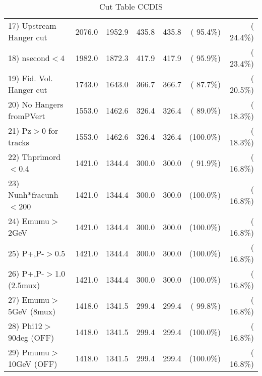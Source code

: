 \begin{table}[h!]
\begin{tabular}{||l||r|r|r|r|r|r||}
 17) Upstream Hanger cut  &       2076.0 &       1952.9 &        435.8 &        435.8 & ( 95.4\%) & ( 24.4\%) \\
 18) nsecond$<$4          &       1982.0 &       1872.3 &        417.9 &        417.9 & ( 95.9\%) & ( 23.4\%) \\
 19) Fid. Vol. Hanger cut &       1743.0 &       1643.0 &        366.7 &        366.7 & ( 87.7\%) & ( 20.5\%) \\
 20) No Hangers fromPVert &       1553.0 &       1462.6 &        326.4 &        326.4 & ( 89.0\%) & ( 18.3\%) \\
 21) Pz$>$0 for tracks    &       1553.0 &       1462.6 &        326.4 &        326.4 & (100.0\%) & ( 18.3\%) \\
 22) Thprimord$<$0.4      &       1421.0 &       1344.4 &        300.0 &        300.0 & ( 91.9\%) & ( 16.8\%) \\
 23) Nunh*fracunh$<$200   &       1421.0 &       1344.4 &        300.0 &        300.0 & (100.0\%) & ( 16.8\%) \\
 24) Emumu$>$2GeV         &       1421.0 &       1344.4 &        300.0 &        300.0 & (100.0\%) & ( 16.8\%) \\
 25) P+,P-$>$0.5          &       1421.0 &       1344.4 &        300.0 &        300.0 & (100.0\%) & ( 16.8\%) \\
 26) P+,P-$>$1.0 (2.5mux) &       1421.0 &       1344.4 &        300.0 &        300.0 & (100.0\%) & ( 16.8\%) \\
 27) Emumu$>$5GeV  (8mux) &       1418.0 &       1341.5 &        299.4 &        299.4 & ( 99.8\%) & ( 16.8\%) \\
 28) Phi12$>$90deg  (OFF) &       1418.0 &       1341.5 &        299.4 &        299.4 & (100.0\%) & ( 16.8\%) \\
 29) Pmumu$>$10GeV  (OFF) &       1418.0 &       1341.5 &        299.4 &        299.4 & (100.0\%) & ( 16.8\%) \\
 \hline
 \hline
 \end{tabular}
 \caption{Cut Table  CCDIS    }
 \label{tab-cutcohjpsi-mumu_ncdis}
 \end{table}
